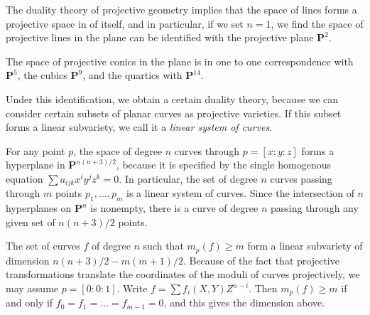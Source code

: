 \begin{example}
    The duality theory of projective geometry implies that the space of lines forms a projective space in of itself, and in particular, if we set $n = 1$, we find the space of projective lines in the plane can be identified with the projective plane $\mathbf{P}^2$.
\end{example}

\begin{example}
    The space of projective conics in the plane is in one to one correspondence with $\mathbf{P}^5$, the cubics $\mathbf{P}^9$, and the quartics with $\mathbf{P}^{14}$.
\end{example}

Under this identification, we obtain a certain duality theory, because we can consider certain subsets of planar curves as projective varieties. If this subset forms a linear subvariety, we call it a \emph{linear system of curves}.

\begin{example}
    For any point $p$, the space of degree $n$ curves through $p = [x:y:z]$ forms a hyperplane in $\mathbf{P}^{n(n+3)/2}$, because it is specified by the single homogenous equation $\sum a_{ijk}x^iy^jz^k = 0$. In particular, the set of degree $n$ curves passing through $m$ points $p_1, \dots, p_m$ is a linear system of curves. Since the intersection of $n$ hyperplanes on $\mathbf{P}^n$ is nonempty, there is a curve of degree $n$ passing through any given set of $n(n+3)/2$ points.
\end{example}

\begin{example}
    The set of curves $f$ of degree $n$ such that $m_p(f) \geq m$ form a linear subvariety of dimension $n(n+3)/2 - m(m+1)/2$. Because of the fact that projective transformations translate the coordinates of the moduli of curves projectively, we may assume $p = [0:0:1]$. Write $f = \sum f_i(X,Y)Z^{n-i}$. Then $m_p(f) \geq m$ if and only if $f_0 = f_1 = \dots = f_{m-1} = 0$, and this gives the dimension above.
\end{example}

